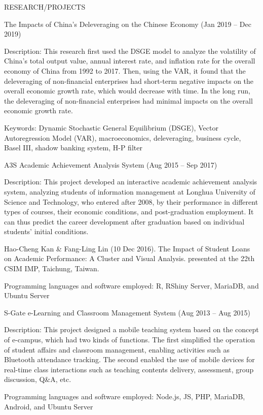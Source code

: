 \documentclass{resume} %
\begin{document}
\begin{rSection}{RESEARCH/PROJECTS}

\begin{rSubSectionTitleList}{The Impacts of China’s Deleveraging on the Chinese Economy (Jan 2019 – Dec 2019)}
\item Description: This research first used the DSGE model to analyze the volatility of China's total output value, annual interest rate, and inflation rate for the overall economy of China from 1992 to 2017. Then, using the VAR, it found that the deleveraging of non-financial enterprises had short-term negative impacts on the overall economic growth rate, which would decrease with time. In the long run, the deleveraging of non-financial enterprises had minimal impacts on the overall economic growth rate.
\item Keywords: Dynamic Stochastic General Equilibrium (DSGE), Vector Autoregression Model (VAR), macroeconomics, deleveraging, business cycle, Basel III, shadow banking system, H-P filter
\end{rSubSectionTitleList}

\begin{rSubSectionTitleList}{A3S Academic Achievement Analysis System (Aug 2015 – Sep 2017)}
\item Description: This project developed an interactive academic achievement analysis system, analyzing students of information management at Longhua University of Science and Technology, who entered after 2008, by their performance in different types of courses, their economic conditions, and post-graduation employment. It can thus predict the career development after graduation based on individual students’ initial conditions.
\item Hao-Cheng Kan \& Fang-Ling Lin (10 Dec 2016). The Impact of Student Loans on Academic Performance: A Cluster and Visual Analysis. presented at the 22th CSIM IMP, Taichung, Taiwan.
\item Programming languages and software employed: R, RShiny Server, MariaDB, and Ubuntu Server
\end{rSubSectionTitleList}

\begin{rSubSectionTitleList}{S-Gate e-Learning and Classroom Management System (Aug 2013 – Aug 2015)}
\item Description: This project designed a mobile teaching system based on the concept of e-campus, which had two kinds of functions. The first simplified the operation of student affairs and classroom management, enabling activities such as Bluetooth attendance tracking. The second enabled the use of mobile devices for real-time class interactions such as teaching contents delivery, assessment, group discussion, Q\&A, etc.
\item Programming languages and software employed: Node.js, JS, PHP, MariaDB, Android, and Ubuntu Server

\end{rSubSectionTitleList}
\end{rSection}




\end{document}
